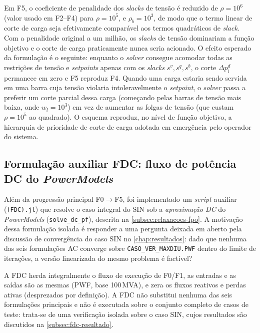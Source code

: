 \noindent Em F5, o coeficiente de penalidade dos \textit{slacks} de tensão é reduzido de $\rho = 10^6$ (valor usado em F2--F4) para $\rho = 10^5$, e $\rho_b = 10^3$, de modo que o termo linear de corte de carga seja efetivamente comparável aos termos quadráticos de \textit{slack}. Com a penalidade original a um milhão, os \textit{slacks} de tensão dominariam a função objetivo e o corte de carga praticamente nunca seria acionado. O efeito esperado da formulação é o seguinte: enquanto o \textit{solver} consegue acomodar todas as restrições de tensão e \textit{setpoints} apenas com os \textit{slacks} $s^v, s^q, s^b$, o corte $\Delta p^d_l$ permanece em zero e F5 reproduz F4. Quando uma carga estaria sendo servida em uma barra cuja tensão violaria intoleravelmente o \textit{setpoint}, o \textit{solver} passa a preferir um corte parcial dessa carga (começando pelas barras de tensão mais baixa, onde $w_l = 10^3$) em vez de aumentar as folgas de tensão (que custam $\rho = 10^5$ ao quadrado). O esquema reproduz, no nível de função objetivo, a hierarquia de prioridade de corte de carga adotada em emergência pelo operador do sistema.

\subsection{Formulação auxiliar FDC: fluxo de potência DC do \textit{PowerModels}}
\label{subsec:fdc}

Além da progressão principal F0$\rightarrow$F5, foi implementado um \textit{script} auxiliar (\texttt{(FDC).jl}) que resolve o caso integral do SIN sob a \emph{aproximação DC} do \textit{PowerModels} (\texttt{solve\_dc\_pf}), descrita na \autoref{subsec:relaxacoes-fpo}. A motivação dessa formulação isolada é responder a uma pergunta deixada em aberto pela discussão de convergência do caso SIN no \autoref{chap:resultados}: dado que nenhuma das seis formulações AC converge sobre \texttt{CASO\_\allowbreak VER\_MAXDIU.PWF} dentro do limite de iterações, a versão linearizada do mesmo problema é factível?

A FDC herda integralmente o fluxo de execução de F0/F1, as entradas e as saídas são as mesmas (PWF, base 100\,MVA), e zera os fluxos reativos e perdas ativas (desprezados por definição). A FDC não substitui nenhuma das seis formulações principais e não é executada sobre o conjunto completo de casos de teste: trata-se de uma verificação isolada sobre o caso SIN, cujos resultados são discutidos na \autoref{subsec:fdc-resultado}.

